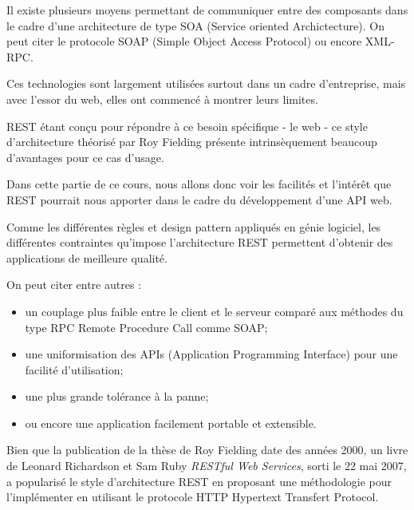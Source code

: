 \documentclass[big]{zmdocument}
\begin{document}
Il existe plusieurs moyens permettant de communiquer entre des composants dans le cadre d'une architecture de type SOA (Service oriented Archictecture). On peut citer le protocole SOAP (Simple Object Access Protocol) ou encore XML-RPC.



Ces technologies sont largement utilisées surtout dans un cadre d'entreprise, mais avec l'essor du web, elles ont commencé à montrer leurs limites.



REST étant conçu pour répondre à ce besoin spécifique - le web - ce style d'architecture théorisé par Roy Fielding présente intrinsèquement beaucoup d'avantages pour ce cas d'usage.



Dans cette partie de ce cours, nous allons donc voir les facilités et l'intérêt que REST pourrait nous apporter dans le cadre du développement d'une API web.







Comme les différentes règles et design pattern appliqués en génie logiciel, les différentes contraintes qu'impose l'architecture REST permettent d'obtenir des applications de meilleure qualité.



On peut citer entre autres :



\begin{itemize}
\item un couplage plus faible entre le client et le serveur comparé aux méthodes du type RPC Remote Procedure Call comme SOAP;
\item une uniformisation des APIs (Application Programming Interface) pour une facilité d'utilisation;
\item une plus grande tolérance à la panne;
\item ou encore une application facilement portable et extensible.
\end{itemize}




Bien que la publication de la thèse de Roy Fielding date des années 2000, un livre de Leonard Richardson et Sam Ruby \textit{RESTful Web Services}, sorti le 22 mai 2007, a popularisé le style d’architecture REST en proposant une méthodologie pour l'implémenter en utilisant le protocole HTTP Hypertext Transfert Protocol.
\end{document}
